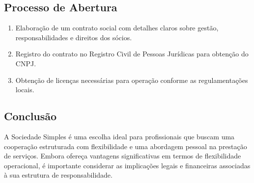 \subsection{Processo de Abertura}
\begin{enumerate}
    \item Elaboração de um contrato social com detalhes claros sobre gestão, responsabilidades e direitos dos sócios.
    \item Registro do contrato no Registro Civil de Pessoas Jurídicas para obtenção do CNPJ.
    \item Obtenção de licenças necessárias para operação conforme as regulamentações locais.
\end{enumerate}

\subsection{Conclusão}
A Sociedade Simples é uma escolha ideal para profissionais que buscam uma cooperação estruturada com flexibilidade e uma abordagem pessoal na prestação de serviços. Embora ofereça vantagens significativas em termos de flexibilidade operacional, é importante considerar as implicações legais e financeiras associadas à sua estrutura de responsabilidade.
